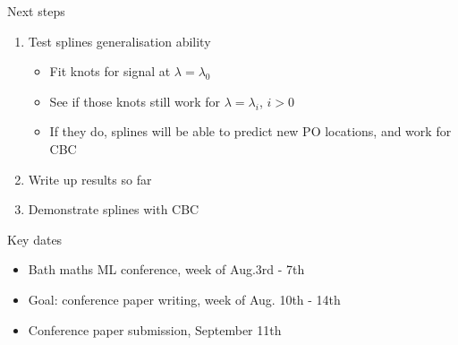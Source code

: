 \documentclass[presentation]{beamer}
\begin{document}
\begin{frame}[label={sec:org58a10eb}]{Next steps}
\begin{enumerate}
\item Test splines generalisation ability
\begin{itemize}
\item Fit knots for signal at \(\lambda = \lambda_0\)
\item See if those knots still work for \(\lambda = \lambda_i\), \(i>0\)
\item If they do, splines will be able to predict new PO locations, and work for CBC
\end{itemize}
\item Write up results so far
\item Demonstrate splines with CBC
\end{enumerate}
\end{frame}

\begin{frame}[label={sec:orgadcda61}]{Key dates}
\begin{itemize}
\item Bath maths ML conference, week of Aug.3rd - 7th
\item Goal: conference paper writing, week of Aug. 10th - 14th
\item Conference paper submission, September 11th
\end{itemize}
\end{frame}
\end{document}
